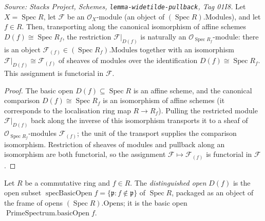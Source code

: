 \begin{lemma}
  \label{mk-lem:modules_restrict_basicOpen}

  \textit{Source: Stacks Project, Schemes, \texttt{lemma-widetilde-pullback}, Tag 01I8.}
  Let \(X = \operatorname{Spec} R\), let \(\mathcal{F}\) be an \(\mathcal{O}_X\)-module
  (an object of \((\operatorname{Spec} R).\mathrm{Modules}\)), and let \(f \in R\). Then,
  transporting along the canonical isomorphism of affine schemes
  \(D(f) \cong \operatorname{Spec} R_f\), the restriction \(\mathcal{F}|_{D(f)}\) is naturally
  an \(\mathcal{O}_{\operatorname{Spec} R_f}\)-module: there is an object
  \(\mathcal{F}_{(f)} \in (\operatorname{Spec} R_f).\mathrm{Modules}\) together with an
  isomorphism \(\mathcal{F}|_{D(f)} \cong \mathcal{F}_{(f)}\) of sheaves of modules over the
  identification \(D(f) \cong \operatorname{Spec} R_f\). This assignment is functorial in
  \(\mathcal{F}\).
\end{lemma}
\begin{proof}
  The basic open \(D(f) \subseteq \operatorname{Spec} R\) is an affine scheme, and the
  canonical comparison \(D(f) \cong \operatorname{Spec} R_f\) is an isomorphism of affine
  schemes (it corresponds to the localisation ring map \(R \to R_f\)). Pulling the restricted
  module \(\mathcal{F}|_{D(f)}\) back along the inverse of this isomorphism transports it to a
  sheaf of \(\mathcal{O}_{\operatorname{Spec} R_f}\)-modules \(\mathcal{F}_{(f)}\); the unit of
  the transport supplies the comparison isomorphism. Restriction of sheaves of modules and
  pullback along an isomorphism are both functorial, so the assignment
  \(\mathcal{F} \mapsto \mathcal{F}_{(f)}\) is functorial in \(\mathcal{F}\).
\end{proof}

\begin{definition}\label{mk-def:spec_basic_open}
  \leanok

  Let \(R\) be a commutative ring and \(f \in R\). The \emph{distinguished open}
  \(D(f)\) is the open subset \(\operatorname{specBasicOpen} f = \{\mathfrak{p} : f \notin
  \mathfrak{p}\}\) of \(\operatorname{Spec} R\), packaged as an object of the frame of opens
  \((\operatorname{Spec} R).\mathrm{Opens}\); it is the basic open \(\operatorname{PrimeSpectrum.basicOpen} f\).
\end{definition}

